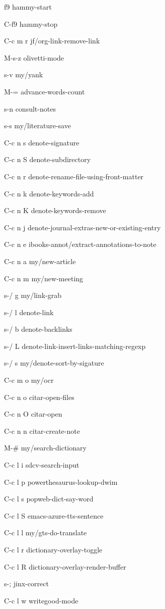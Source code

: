 \documentclass[10pt]{article}
\begin{document}
\begin{multicols}{4}
\begin{keylist}
  \item[f9] hammy-start
  \item[C-f9] hammy-stop

  \item[C-c m r] jf/org-link-remove-link

  \item[M-s-z] olivetti-mode

  \item[s-v] my/yank
  \item[M-=] advance-words-count

  \item[s-n] consult-notes
  \item[s-s] my/literature-save

  \item[C-c n s] denote-signature
  \item[C-c n S] denote-subdirectory
  \item[C-c n r] denote-rename-file-using-front-matter
  \item[C-c n k] denote-keywords-add
  \item[C-c n K] denote-keywords-remove
  \item[C-c n j] denote-journal-extras-new-or-existing-entry
  \item[C-c n e] ibooks-annot/extract-annotations-to-note
  \item[C-c n a] my/new-article
  \item[C-c n m] my/new-meeting

  \item[s-/ g] my/link-grab
  \item[s-/ l] denote-link
  \item[s-/ b] denote-backlinks
  \item[s-/ L] denote-link-insert-links-matching-regexp
  \item[s-/ s] my/denote-sort-by-sigature

  \item[C-c m o] my/ocr

  \item[C-c n o] citar-open-files
  \item[C-c n O] citar-open
  \item[C-c n n] citar-create-note


  \item[M-#] my/search-dictionary
  \item[C-c l i] sdcv-search-input
  \item[C-c l p] powerthesaurus-lookup-dwim
  \item[C-c l s] popweb-dict-say-word
  \item[C-c l S] emacs-azure-tts-sentence
  \item[C-c l l] my/gts-do-translate
  \item[C-c l r] dictionary-overlay-toggle
  \item[C-c l R] dictionary-overlay-render-buffer
  \item[s-;] jinx-correct
  \item[C-c l w] writegood-mode


\end{keylist}
\end{multicols}
\end{document}
